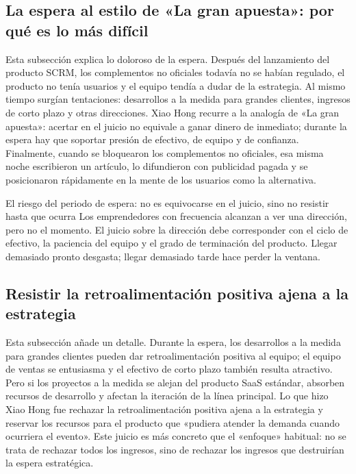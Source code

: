 \documentclass[a4paper]{article}
\begin{document}
\subsection{La espera al estilo de «La gran apuesta»: por qué es lo más difícil}

Esta subsección explica lo doloroso de la espera. Después del lanzamiento del producto SCRM, los complementos no oficiales todavía no se habían regulado, el producto no tenía usuarios y el equipo tendía a dudar de la estrategia. Al mismo tiempo surgían tentaciones: desarrollos a la medida para grandes clientes, ingresos de corto plazo y otras direcciones. Xiao Hong recurre a la analogía de «La gran apuesta»: acertar en el juicio no equivale a ganar dinero de inmediato; durante la espera hay que soportar presión de efectivo, de equipo y de confianza. Finalmente, cuando se bloquearon los complementos no oficiales, esa misma noche escribieron un artículo, lo difundieron con publicidad pagada y se posicionaron rápidamente en la mente de los usuarios como la alternativa.

\begin{warningbox}{El riesgo del periodo de espera: no es equivocarse en el juicio, sino no resistir hasta que ocurra}
Los emprendedores con frecuencia alcanzan a ver una dirección, pero no el momento. El juicio sobre la dirección debe corresponder con el ciclo de efectivo, la paciencia del equipo y el grado de terminación del producto. Llegar demasiado pronto desgasta; llegar demasiado tarde hace perder la ventana.
\end{warningbox}

\subsection{Resistir la retroalimentación positiva ajena a la estrategia}

Esta subsección añade un detalle. Durante la espera, los desarrollos a la medida para grandes clientes pueden dar retroalimentación positiva al equipo; el equipo de ventas se entusiasma y el efectivo de corto plazo también resulta atractivo. Pero si los proyectos a la medida se alejan del producto SaaS estándar, absorben recursos de desarrollo y afectan la iteración de la línea principal. Lo que hizo Xiao Hong fue rechazar la retroalimentación positiva ajena a la estrategia y reservar los recursos para el producto que «pudiera atender la demanda cuando ocurriera el evento». Este juicio es más concreto que el «enfoque» habitual: no se trata de rechazar todos los ingresos, sino de rechazar los ingresos que destruirían la espera estratégica.
\end{document}
